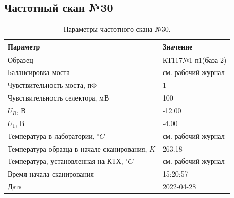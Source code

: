 \subsection{Частотный скан №30}
\begin{table}[!ht]
    \centering
    \caption{Параметры частотного скана №30.}
    \begin{tabular}{|l|l|}
        \hline
        Параметр                                       & Значение                  \\ \hline
        Образец                                        & КТ117№1 п1(база 2)        \\ \hline
        Балансировка моста                             & см. рабочий журнал        \\ \hline
        Чувствительность моста, пФ                     & 1                         \\ \hline
        Чувствительность селектора, мВ                 & 100                       \\ \hline
        $U_R$, В                                       & -12.00                    \\ \hline
        $U_1$, В                                       & -4.00                     \\ \hline
        Температура в лаборатории, $^\circ C$          & см. рабочий журнал        \\ \hline
        Температура образца в начале сканирования, $K$ & 263.18                    \\ \hline
        Температура, установленная на КТХ, $^\circ C$  & см. рабочий журнал        \\ \hline
        Время начала сканирования                      & 15:20:57                  \\ \hline
        Дата                                           & 2022-04-28                \\ \hline
    \end{tabular}
    \label{table:frequency_scan_30}
\end{table}

